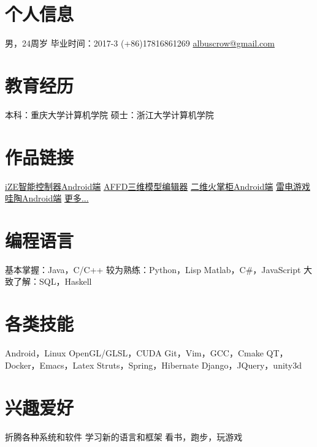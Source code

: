 \documentclass[print]{friggeri-cv_cn} %
\begin{document}


\begin{aside} %
\section{个人信息}
男，24周岁
毕业时间：2017-3
(+86)17816861269
\href{mailto:albuscrow@gmail.com}{albuscrow@gmail.com}
\section{教育经历}
本科：重庆大学计算机学院
硕士：浙江大学计算机学院
\section{作品链接}
\href{http://www.hisensehitachi.com/jstx/index.aspx?nodeid=1162}{iZE智能控制器Android端}
\href{https://github.com/albuscrow/AFFD}{AFFD三维模型编辑器}
\href{http://www.jinxizi.cn/android/huozhanggui.html}{二维火掌柜Android端}
\href{https://github.com/albuscrow/learn_unity}{雷电游戏}
\href{http://36kr.com/p/5043478.html}{哇陶Android端}
\href{https://github.com/albuscrow}{更多...}
\section{编程语言}
基本掌握：Java，C/C++
较为熟练：Python，Lisp Matlab，C\#，JavaScript
大致了解：SQL，Haskell
\section{各类技能}
\LARGE{Android}\normalsize{，}\LARGE{Linux}
\large{OpenGL/GLSL}\normalsize{，}\large{CUDA}
\large{Git}\normalsize{，}\large{Vim}\normalsize{，GCC，Cmake}
\normalsize{QT，Docker，Emacs，Latex}
\small{Struts}\normalsize{，}\small{Spring}\normalsize{，}\small{Hibernate}
\small{Django}\normalsize{，}\small{JQuery}\normalsize{，}\small{unity3d}
\section{兴趣爱好}
\normalsize{折腾各种系统和软件
学习新的语言和框架
看书，跑步，玩游戏}
\end{aside}
\end{document}
